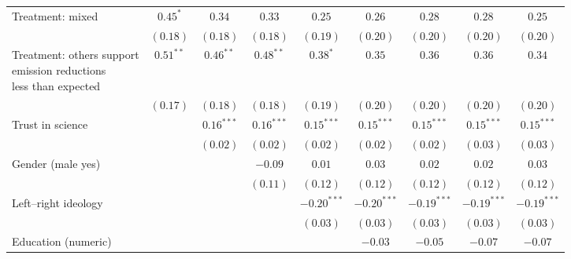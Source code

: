 \begin{table}[h]
\begin{center}
\begin{tabular}{l c c c c c c c c}
Treatment: mixed                                                                & $0.45^{*}$   & $0.34$       & $0.33$       & $0.25$        & $0.26$        & $0.28$        & $0.28$        & $0.25$        \\
                                                                                & $(0.18)$     & $(0.18)$     & $(0.18)$     & $(0.19)$      & $(0.20)$      & $(0.20)$      & $(0.20)$      & $(0.20)$      \\
\shortstack{Treatment: others support\\emission reductions\\less than expected} & $0.51^{**}$  & $0.46^{**}$  & $0.48^{**}$  & $0.38^{*}$    & $0.35$        & $0.36$        & $0.36$        & $0.34$        \\
                                                                                & $(0.17)$     & $(0.18)$     & $(0.18)$     & $(0.19)$      & $(0.20)$      & $(0.20)$      & $(0.20)$      & $(0.20)$      \\
Trust in science                                                                &              & $0.16^{***}$ & $0.16^{***}$ & $0.15^{***}$  & $0.15^{***}$  & $0.15^{***}$  & $0.15^{***}$  & $0.15^{***}$  \\
                                                                                &              & $(0.02)$     & $(0.02)$     & $(0.02)$      & $(0.02)$      & $(0.02)$      & $(0.03)$      & $(0.03)$      \\
Gender (male yes)                                                               &              &              & $-0.09$      & $0.01$        & $0.03$        & $0.02$        & $0.02$        & $0.03$        \\
                                                                                &              &              & $(0.11)$     & $(0.12)$      & $(0.12)$      & $(0.12)$      & $(0.12)$      & $(0.12)$      \\
Left–right ideology                                                             &              &              &              & $-0.20^{***}$ & $-0.20^{***}$ & $-0.19^{***}$ & $-0.19^{***}$ & $-0.19^{***}$ \\
                                                                                &              &              &              & $(0.03)$      & $(0.03)$      & $(0.03)$      & $(0.03)$      & $(0.03)$      \\
Education (numeric)                                                             &              &              &              &               & $-0.03$       & $-0.05$       & $-0.07$       & $-0.07$       \\

\end{tabular}
\end{center}
\end{table}
